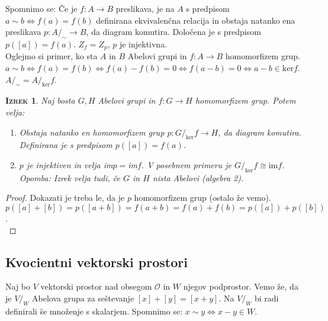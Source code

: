 \documentclass[a4paper,12pt]{article}
\newtheorem*{izrek}{\textsc{Izrek}}
\begin{document}
Spomnimo se: Če je $f:A\to B$ preslikava, je na $A$ s predpisom $a\sim b \Leftrightarrow f(a)=f(b)$ definirana ekvivalenčna relacija in obstaja natanko ena preslikava $p: A/_\sim \to B$, da diagram \Smiley{} komutira. Določena je s predpisom $p([a])=f(a)$. $Z_f=Z_p$, $p$ je injektivna. \\

Oglejmo si primer, ko sta $A$ in $B$ Abelovi grupi in $f:A\to B$ homomorfizem grup. \\

$a\sim b \Leftrightarrow f(a)=f(b) \Leftrightarrow f(a)-f(b) = 0  \Leftrightarrow f(a-b)=0 \Leftrightarrow a-b\in \text{ker}f$. \\

$A/_\sim = A/_\text{ker}f$. \\

\begin{izrek}
Naj bosta $G,H$ Abelovi grupi in $f:G\to H$ homomorfizem grup. Potem velja:
\begin{enumerate}
\item Obstaja natanko en homomorfizem grup $p:G/_\text{ker}f \to H$, da diagram \Smiley{} komutira. Definirana je s predpisom $p([a])=f(a)$. 
\item $p$ je injektiven in velja im$p=$im$f$. V posebnem primeru je $G/_\text{ker}f \cong \text{im}f$. \\

Opomba: Izrek velja tudi, če $G$ in $H$ nista Abelovi (algebra 2).\\ 
\end{enumerate}
\end{izrek}

\begin{proof}
Dokazati je treba le, da je $p$ homomorfizem grup (ostalo že vemo). \\

$p([a]+[b])=p([a+b])=f(a+b)=f(a)+f(b)=p([a])+p([b])$. \\
\end{proof}

\newpage

\subsection{Kvocientni vektorski prostori}

Naj bo $V$ vektorski prostor nad obsegom $\mathcal{O}$ in $W$ njegov podprostor. Vemo že, da je $V/_W$ Abelova grupa za seštevanje $[x]+[y]=[x+y]$. Na $V/_W$ bi radi definirali še množenje s skalarjem. Spomnimo se: $x\sim y \Leftrightarrow x-y\in W$.\\
\end{document}
